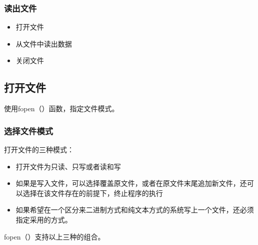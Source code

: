 \documentclass[11pt]{article}
\begin{document}
\subsubsection{读出文件}
\label{sec:org7f7df91}
\begin{itemize}
\item 打开文件
\item 从文件中读出数据
\item 关闭文件
\end{itemize}
\subsection{打开文件}
\label{sec:org476e72a}
使用fopen（）函数，指定文件模式。
\subsubsection{选择文件模式}
\label{sec:orgfda579d}
打开文件的三种模式：

\begin{itemize}
\item 打开文件为只读、只写或者读和写
\item 如果是写入文件，可以选择覆盖原文件，或者在原文件末尾追加新文件，还可
以选择在该文件存在的前提下，终止程序的执行
\item 如果希望在一个区分来二进制方式和纯文本方式的系统写上一个文件，还必须
指定采用的方式。
\end{itemize}

fopen（）支持以上三种的组合。
\end{document}
